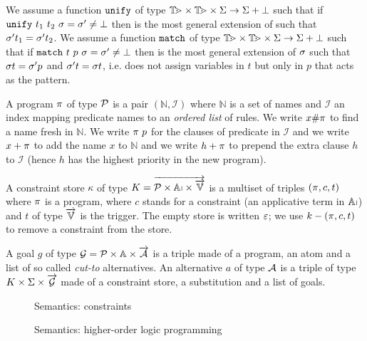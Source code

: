 \documentclass[a4paper, 11pt]{book}
\begin{document}
We assume a function $\unify$ of type $\TERM \times \TERM \times \Sigma \to \Sigma + \bot$
such that if $\unifyCmd{t_1}{t_2}{\subst}{\subst[']} \not= \bot$ 
then \subst['] is the most general extension of \subst 
such that $\subst['] t_1 = \subst['] t_2$.
We assume a function $\match$ of type $\TERM \times \TERM \times \Sigma \to \Sigma + \bot$
such that if $\matchCmd{t}{p}{\subst}{\subst[']} \not= \bot$
then \subst[']  is the most general extension of  $\subst$
such that $\subst t = \subst['] p$ and $\subst[']t = \subst t$,
i.e. \match{} does not assign variables in $t$ but only in $p$ that acts as the pattern.

A program $\prog$ of type $\PROG$ is a pair $(\mathbb{N}, \mathcal{I})$
where $\mathbb{N}$ is a set of names and $\mathcal{I}$ an index
mapping predicate names to an \emph{ordered list} of rules.
We write $x \# \prog$ to find a name fresh in $\mathbb{N}$.
We write $\prog~\pred$ for the clauses of predicate \pred in $\mathcal{I}$
and we write $x + \prog$ to add the name $x$ to $\mathbb{N}$
and we write $h + \prog$ to prepend the extra clause $h$  to $\mathcal{I}$
(hence $h$ has the highest priority in the new program).

A constraint store $\kappa$ of type $K = \vecL{\PROG \times \APP \times \vecL{\VAR}}$
is a multiset of triples $(\prog,c,t)$
where $\prog$ is a program, where $c$ stands for a constraint (an applicative term in $\APP$) and $t$
of type $\vecL{\VAR}$ is the trigger. The empty store is written $\EmptySubst$;
we use $k - (\prog,c,t)$ to remove a constraint from the store.

A goal $g$ of type $\g = \PROG \times \ATOM \times \vecL{\alt}$
is a triple made of a program, an atom and a list of
so called \emph{cut-to} alternatives.
An alternative $a$ of type $\alt$ is a triple of type $K \times \Sigma \times \vecL{\g}$
made of a constraint store, a substitution and a list of goals.

\begin{figure}[!]
    \centering

  \caption{Semantics: constraints}
    \label{fig:basic-interp-c}
\end{figure}

  \begin{figure}[!]
  \centering
%


  
  \caption{Semantics: higher-order logic programming}
    \label{fig:basic-interp-l}
\end{figure}
\end{document}
